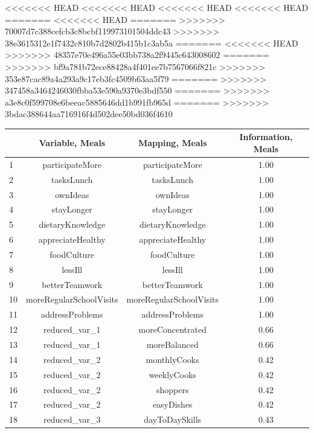 \documentclass[12pt, a4paper, titlepage]{article}\usepackage[]{graphicx}\usepackage[]{color}
\begin{document}
<<<<<<< HEAD
<<<<<<< HEAD
<<<<<<< HEAD
<<<<<<< HEAD
=======
<<<<<<< HEAD
=======
>>>>>>> 70007d7c388cefcb3c8bcbf119973101504ddc43
>>>>>>> 38e3615312e1f7432c810b7d2802b415b1c3ab5a
=======
<<<<<<< HEAD
>>>>>>> 48357e70e496a55e03bb738a2f9445c643008602
=======
>>>>>>> bf9a781b72ece88428a4f401ee7b7567066f821c
>>>>>>> 353e87cac89a4a293a9c17eb3fc4509b63aa5f79
=======
>>>>>>> 347458a3464246030fbba53e590a9370e3bdf550
=======
>>>>>>> a3e8c0f599708e6beeac5885646dd1b991fb965d
=======
>>>>>>> 3bdac388644aa716916f4d502dee50bd036f4610
\begin{table}[ht]
\centering
\begin{tabular}{lccc}
  \hline
 & Variable, Meals & Mapping, Meals & Information, Meals \\ 
  \hline
1 & participateMore & participateMore & 1.00 \\ 
  2 & tasksLunch & tasksLunch & 1.00 \\ 
  3 & ownIdeas & ownIdeas & 1.00 \\ 
  4 & stayLonger & stayLonger & 1.00 \\ 
  5 & dietaryKnowledge & dietaryKnowledge & 1.00 \\ 
  6 & appreciateHealthy & appreciateHealthy & 1.00 \\ 
  7 & foodCulture & foodCulture & 1.00 \\ 
  8 & lessIll & lessIll & 1.00 \\ 
  9 & betterTeamwork & betterTeamwork & 1.00 \\ 
  10 & moreRegularSchoolVisits & moreRegularSchoolVisits & 1.00 \\ 
  11 & addressProblems & addressProblems & 1.00 \\ 
  12 & reduced\_var\_1 & moreConcentrated & 0.66 \\ 
  13 & reduced\_var\_1 & moreBalanced & 0.66 \\ 
  14 & reduced\_var\_2 & monthlyCooks & 0.42 \\ 
  15 & reduced\_var\_2 & weeklyCooks & 0.42 \\ 
  16 & reduced\_var\_2 & shoppers & 0.42 \\ 
  17 & reduced\_var\_2 & easyDishes & 0.42 \\ 
  18 & reduced\_var\_3 & dayToDaySkills & 0.43 \\ 

\end{tabular}
\end{table}
\end{document}
